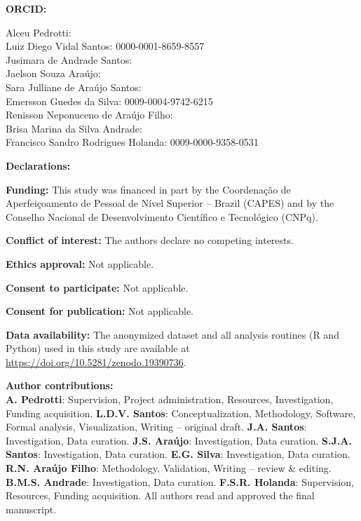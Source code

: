 \documentclass[12pt,a4paper]{article}
\begin{document}
\noindent\textbf{ORCID:}

\medskip

\noindent
Alceu Pedrotti: \\
Luiz Diego Vidal Santos: 0000-0001-8659-8557\\
Jusimara de Andrade Santos: \\
Jaelson Souza Ara\'{u}jo: \\
Sara Julliane de Ara\'{u}jo Santos: \\
Emersson Guedes da Silva: 0009-0004-9742-6215\\
Renisson Neponuceno de Ara\'{u}jo Filho: \\
Brisa Marina da Silva Andrade: \\
Francisco Sandro Rodrigues Holanda: 0009-0000-9358-0531

\bigskip

\noindent\textbf{Declarations:}

\medskip

\noindent\textbf{Funding:} This study was financed in part by the Coordena\c{c}\~{a}o de Aperfei\c{c}oamento de Pessoal de N\'{i}vel Superior -- Brazil (CAPES) and by the Conselho Nacional de Desenvolvimento Cient\'{i}fico e Tecnol\'{o}gico (CNPq).

\medskip

\noindent\textbf{Conflict of interest:} The authors declare no competing interests.

\medskip

\noindent\textbf{Ethics approval:} Not applicable.

\medskip

\noindent\textbf{Consent to participate:} Not applicable.

\medskip

\noindent\textbf{Consent for publication:} Not applicable.

\medskip

\noindent\textbf{Data availability:} The anonymized dataset and all analysis routines (R and Python) used in this study are available at \url{https://doi.org/10.5281/zenodo.19390736}.

\medskip

\noindent\textbf{Author contributions:}\\
\textbf{A. Pedrotti}: Supervision, Project administration, Resources, Investigation, Funding acquisition.
\textbf{L.D.V. Santos}: Conceptualization, Methodology, Software, Formal analysis, Visualization, Writing -- original draft.
\textbf{J.A. Santos}: Investigation, Data curation.
\textbf{J.S. Ara\'{u}jo}: Investigation, Data curation.
\textbf{S.J.A. Santos}: Investigation, Data curation.
\textbf{E.G. Silva}: Investigation, Data curation.
\textbf{R.N. Ara\'{u}jo Filho}: Methodology, Validation, Writing -- review \& editing.
\textbf{B.M.S. Andrade}: Investigation, Data curation.
\textbf{F.S.R. Holanda}: Supervision, Resources, Funding acquisition.
All authors read and approved the final manuscript.
\end{document}

